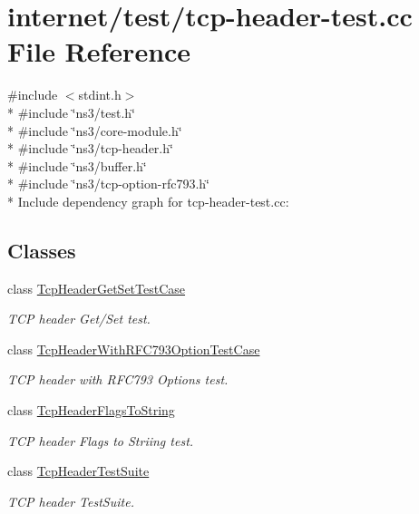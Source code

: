 \hypertarget{tcp-header-test_8cc}{}\section{internet/test/tcp-\/header-\/test.cc File Reference}
\label{tcp-header-test_8cc}
{\ttfamily \#include $<$stdint.\+h$>$}\\*
{\ttfamily \#include \char`\"{}ns3/test.\+h\char`\"{}}\\*
{\ttfamily \#include \char`\"{}ns3/core-\/module.\+h\char`\"{}}\\*
{\ttfamily \#include \char`\"{}ns3/tcp-\/header.\+h\char`\"{}}\\*
{\ttfamily \#include \char`\"{}ns3/buffer.\+h\char`\"{}}\\*
{\ttfamily \#include \char`\"{}ns3/tcp-\/option-\/rfc793.\+h\char`\"{}}\\*
Include dependency graph for tcp-\/header-\/test.cc\+:
\subsection*{Classes}
\begin{DoxyCompactItemize}
\item 
class \hyperlink{classTcpHeaderGetSetTestCase}{Tcp\+Header\+Get\+Set\+Test\+Case}
\begin{DoxyCompactList}\small\item\em T\+CP header Get/\+Set test. \end{DoxyCompactList}\item 
class \hyperlink{classTcpHeaderWithRFC793OptionTestCase}{Tcp\+Header\+With\+R\+F\+C793\+Option\+Test\+Case}
\begin{DoxyCompactList}\small\item\em T\+CP header with R\+F\+C793 Options test. \end{DoxyCompactList}\item 
class \hyperlink{classTcpHeaderFlagsToString}{Tcp\+Header\+Flags\+To\+String}
\begin{DoxyCompactList}\small\item\em T\+CP header Flags to Striing test. \end{DoxyCompactList}\item 
class \hyperlink{classTcpHeaderTestSuite}{Tcp\+Header\+Test\+Suite}
\begin{DoxyCompactList}\small\item\em T\+CP header Test\+Suite. \end{DoxyCompactList}\end{DoxyCompactItemize}

